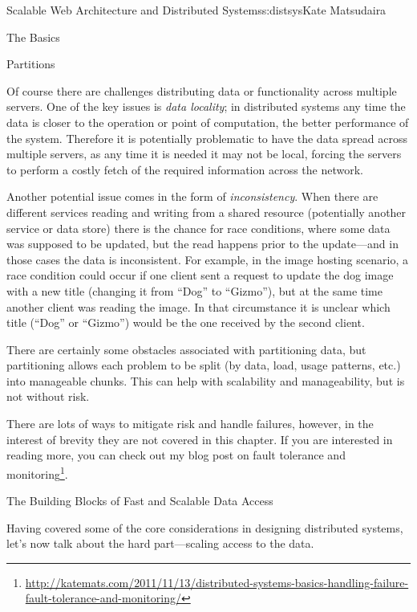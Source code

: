 \begin{aosachapter}{Scalable Web Architecture and Distributed Systems}{s:distsys}{Kate Matsudaira}
\begin{aosasect1}{The Basics}
\begin{aosasect2}{Partitions}

Of course there are challenges distributing data or functionality
across multiple servers. One of the key issues is \emph{data
  locality}; in distributed systems any time the data is closer to the
operation or point of computation, the better performance of the
system. Therefore it is potentially problematic to have the data
spread across multiple servers, as any time it is needed it may not be
local, forcing the servers to perform a costly fetch of the required
information across the network.

Another potential issue comes in the form of
\emph{inconsistency}. When there are different services reading and
writing from a shared resource (potentially another service or data
store) there is the chance for race conditions, where some data was
supposed to be updated, but the read happens prior to the update---and
in those cases the data is inconsistent. For example, in the image
hosting scenario, a race condition could occur if one client sent a
request to update the dog image with a new title (changing it from
``Dog'' to ``Gizmo''), but at the same time another client was reading
the image. In that circumstance it is unclear which title (``Dog'' or
``Gizmo'') would be the one received by the second client.

There are certainly some obstacles associated with partitioning data,
but partitioning allows each problem to be split (by data, load, usage
patterns, etc.) into manageable chunks. This can help with scalability
and manageability, but is not without risk.

There are lots of ways to mitigate risk and handle failures, however,
in the interest of brevity they are not covered in this chapter. If
you are interested in reading more, you can check out my blog post
on fault tolerance and monitoring\footnote{\url{http://katemats.com/2011/11/13/distributed-systems-basics-handling-failure-fault-tolerance-and-monitoring/}}.

\end{aosasect2}

\end{aosasect1}

\begin{aosasect1}{The Building Blocks of Fast and Scalable Data Access}

Having covered some of the core considerations in designing
distributed systems, let’s now talk about the hard part---scaling
access to the data.


\end{aosasect1}
\end{aosachapter}
